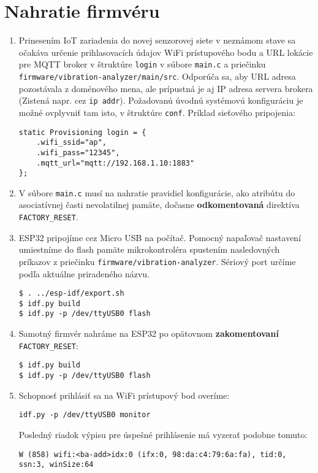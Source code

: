 \section{Nahratie firmvéru}
\begin{enumerate}
\item {Prinesením IoT zariadenia do novej senzorovej siete v neznámom stave sa očakáva určenie 
prihlasovacích údajov WiFi prístupového bodu a URL lokácie pre MQTT broker v štruktúre
\verb|login| v súbore \verb|main.c| a priečinku \verb|firmware/vibration-analyzer/main/src|.
Odporúča sa, aby URL adresa pozostávala z doménového mena, ale prípustná je aj IP adresa servera
brokera (Zistená napr. cez \verb|ip addr|). Požadovanú úvodnú systémovú konfiguráciu je možné
ovplyvniť tam isto, v štruktúre \verb|conf|. Príklad sieťového pripojenia:
\begin{lstlisting}[style=messages, morekeywords = {"ap","12345","mqtt://192.168.1.10:1883"}]
static Provisioning login = {
    .wifi_ssid="ap",
    .wifi_pass="12345",
    .mqtt_url="mqtt://192.168.1.10:1883"
};
\end{lstlisting}}

\item V súbore \verb|main.c| musí na nahratie pravidiel konfigurácie, ako atribútu do asociatívnej časti nevolatilnej pamäte, 
dočasne \textbf{odkomentovaná} direktíva \verb|FACTORY_RESET|.

\item ESP32 pripojíme cez Micro USB na počítač. Pomocný napaľovač nastavení umiestníme do flash pamäte mikrokontroléra spustením nasledovných príkazov z priečinku \verb|firmware/vibration-analyzer|. Sériový port určíme podľa aktuálne priradeného názvu.
\begin{lstlisting}[style=messages]
$ . ../esp-idf/export.sh
$ idf.py build
$ idf.py -p /dev/ttyUSB0 flash
\end{lstlisting}

\item Samotný firmvér nahráme na ESP32 po opätovnom \textbf{zakomentovaní} \\ \verb|FACTORY_RESET|:
\begin{lstlisting}[style=messages]
$ idf.py build
$ idf.py -p /dev/ttyUSB0 flash
\end{lstlisting}

\item Schopnosť prihlásiť sa na WiFi prístupový bod overíme:
\begin{lstlisting}[style=messages]
idf.py -p /dev/ttyUSB0 monitor
\end{lstlisting}
Posledný riadok výpisu pre úspešné prihlásenie má vyzerať podobne tomuto:
\begin{lstlisting}[style=messages]
W (858) wifi:<ba-add>idx:0 (ifx:0, 98:da:c4:79:6a:fa), tid:0, ssn:3, winSize:64
\end{lstlisting}


\end{enumerate}
